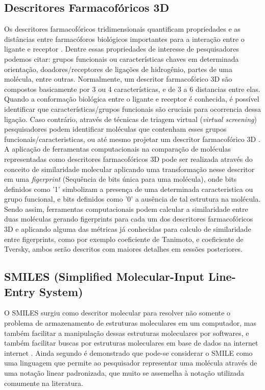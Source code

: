 \subsection{Descritores Farmacofóricos 3D}
Os descritores farmacofóricos tridimensionais quantificam propriedades e as distâncias entre  farmacóforos biológicos importantes para a interação entre o ligante e receptor  \cite{bajorath2004chemoinformatics}. Dentre essas propriedades de interesse de pesquisadores podemos citar: grupos funcionais ou características chaves em determinada orientação, doadores/receptores de ligações de hidrogênio, partes de uma molécula, entre outras. Normalmente, um descritor farmacofórico 3D são compostos basicamente por 3 ou 4 características, e de 3 a 6 distancias entre elas. 
Quando a conformação biológica entre o ligante e receptor é conhecida, é possível identificar     
que características/grupos funcionais são cruciais para ocorrencia dessa ligação. Caso contrário, através de técnicas de triagem virtual (\textit{virtual screening}) pesquisadores podem identificar moléculas que contenham esses grupos funcionais/caracteristicas, ou até mesmo projetar um descritor farmacofórico 3D \cite{bajorath2004chemoinformatics}. 
A aplicação de ferramentas computacionais na comparação de moléculas representadas como descritores farmacofóricos 3D pode ser realizada através do conceito de similaridade molecular aplicando uma transformação nesse descritor em uma \textit{figerprint} (Sequência de bits única para uma molécula), onde bits definidos como '1' simbolizam a presença de uma determinada caracteristica ou grupo funcional, e bits definidos como '0' a ausência de tal estrutura na molécula. Sendo assim, ferramentas computacionais podem calcular a similaridade entre duas moléculas gerando figerprints para cada um dos descritores farmacofóricos 3D e aplicando alguma das métricas já conhecidas para calculo de similaridade entre figerprints, como por exemplo coeficiente de Tanimoto, e coeficiente de Tversky, ambos serão descritos com maiores detalhes em sessões posteriores.          

\subsection{SMILES (Simplified Molecular-Input Line-Entry System)}
     
O SMILES surgiu como descritor molecular para resolver não somente o problema de 
armazenamento de estruturas moleculares em um computador, mas também facilitar a 
manipulação dessas estruturas moleculares por softwares, e também facilitar buscas por 
estruturas moleculares em base de dados na internet internet \cite{kumar2012}. Ainda segundo \cite{kumar2012} é demonstrado que pode-se considerar o SMILE como uma linguagem que permite ao pesquisador representar uma molécula através de uma notação linear padronizada, que muito 
se assemelha à notação utilizada comumente na literatura.

